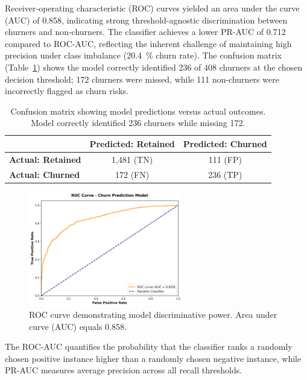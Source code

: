 \documentclass[12pt]{article}
\begin{document}
Receiver‑operating characteristic (ROC) curves yielded an area under the curve (AUC) of 0.858, indicating strong threshold-agnostic discrimination between churners and non‑churners. The classifier achieves a lower PR-AUC of 0.712 compared to ROC-AUC, reflecting the inherent challenge of maintaining high precision under class imbalance (20.4~\% churn rate). The confusion matrix (Table~\ref{tab:confusion_matrix}) shows the model correctly identified 236 of 408 churners at the chosen decision threshold; 172 churners were missed, while 111 non-churners were incorrectly flagged as churn risks.

\begin{table}[H]
\centering
\small
\caption{Confusion matrix showing model predictions versus actual outcomes. Model correctly identified 236 churners while missing 172.}
\label{tab:confusion_matrix}
\begin{tabular}{lcc}
\toprule
& \textbf{Predicted: Retained} & \textbf{Predicted: Churned} \\
\midrule
\textbf{Actual: Retained} & 1,481 (TN) & 111 (FP) \\
\textbf{Actual: Churned} & 172 (FN) & 236 (TP) \\
\bottomrule
\end{tabular}
\end{table}

\begin{figure}[H]
\centering
\includegraphics[width=0.6\textwidth]{img/17_roc_curve.png}
\caption{ROC curve demonstrating model discriminative power. Area under curve (AUC) equals 0.858.}
\label{fig:roc_curve}
\end{figure}

The ROC-AUC quantifies the probability that the classifier ranks a randomly chosen positive instance higher than a randomly chosen negative instance, while PR-AUC measures average precision across all recall thresholds.
\end{document}
